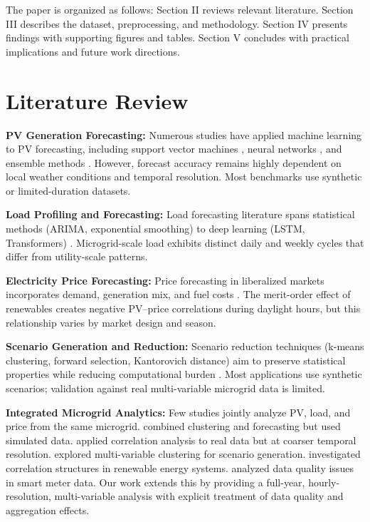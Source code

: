 \documentclass[conference]{IEEEtran}
\begin{document}
The paper is organized as follows: Section II reviews relevant literature. Section III describes the dataset, preprocessing, and methodology. Section IV presents findings with supporting figures and tables. Section V concludes with practical implications and future work directions.

\section{Literature Review}
\label{sec:literature}

\textbf{PV Generation Forecasting:} Numerous studies have applied machine learning to PV forecasting, including support vector machines \cite{b1}, neural networks \cite{b2}, and ensemble methods \cite{b9}. However, forecast accuracy remains highly dependent on local weather conditions and temporal resolution. Most benchmarks use synthetic or limited-duration datasets.

\textbf{Load Profiling and Forecasting:} Load forecasting literature spans statistical methods (ARIMA, exponential smoothing) to deep learning (LSTM, Transformers) \cite{b3,b10}. Microgrid-scale load exhibits distinct daily and weekly cycles that differ from utility-scale patterns.

\textbf{Electricity Price Forecasting:} Price forecasting in liberalized markets incorporates demand, generation mix, and fuel costs \cite{b4,b11}. The merit-order effect of renewables creates negative PV–price correlations during daylight hours, but this relationship varies by market design and season.

\textbf{Scenario Generation and Reduction:} Scenario reduction techniques (k-means clustering, forward selection, Kantorovich distance) aim to preserve statistical properties while reducing computational burden \cite{b5,b6,b12}. Most applications use synthetic scenarios; validation against real multi-variable microgrid data is limited.

\textbf{Integrated Microgrid Analytics:} Few studies jointly analyze PV, load, and price from the same microgrid. \cite{b7} combined clustering and forecasting but used simulated data. \cite{b8} applied correlation analysis to real data but at coarser temporal resolution. \cite{b13} explored multi-variable clustering for scenario generation. \cite{b14} investigated correlation structures in renewable energy systems. \cite{b15} analyzed data quality issues in smart meter data. Our work extends this by providing a full-year, hourly-resolution, multi-variable analysis with explicit treatment of data quality and aggregation effects.
\end{document}
